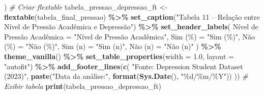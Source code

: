 \documentclass[
]{article}
\newenvironment{Shaded}{\begin{snugshade}}{\end{snugshade}}
\newcommand{\AttributeTok}[1]{\textcolor[rgb]{0.13,0.29,0.53}{#1}}
\newcommand{\CommentTok}[1]{\textcolor[rgb]{0.56,0.35,0.01}{\textit{#1}}}
\newcommand{\FloatTok}[1]{\textcolor[rgb]{0.00,0.00,0.81}{#1}}
\newcommand{\FunctionTok}[1]{\textcolor[rgb]{0.13,0.29,0.53}{\textbf{#1}}}
\newcommand{\NormalTok}[1]{#1}
\newcommand{\OtherTok}[1]{\textcolor[rgb]{0.56,0.35,0.01}{#1}}
\newcommand{\SpecialCharTok}[1]{\textcolor[rgb]{0.81,0.36,0.00}{\textbf{#1}}}
\newcommand{\StringTok}[1]{\textcolor[rgb]{0.31,0.60,0.02}{#1}}
\begin{document}
\begin{Shaded}
\begin{Highlighting}[]
\NormalTok{  )}
\CommentTok{\# Criar flextable}
\NormalTok{tabela\_pressao\_depressao\_ft }\OtherTok{\textless{}{-}} \FunctionTok{flextable}\NormalTok{(tabela\_final\_pressao) }\SpecialCharTok{\%\textgreater{}\%}
  \FunctionTok{set\_caption}\NormalTok{(}\StringTok{"Tabela 11 – Relação entre Nível de Pressão Acadêmica e Depressão"}\NormalTok{) }\SpecialCharTok{\%\textgreater{}\%}
  \FunctionTok{set\_header\_labels}\NormalTok{(}
    \StringTok{\textasciigrave{}}\AttributeTok{Nível de Pressão Acadêmica}\StringTok{\textasciigrave{}} \OtherTok{=} \StringTok{"Nível de Pressão Acadêmica"}\NormalTok{,}
    \StringTok{\textasciigrave{}}\AttributeTok{Sim (\%)}\StringTok{\textasciigrave{}} \OtherTok{=} \StringTok{"Sim (\%)"}\NormalTok{,}
    \StringTok{\textasciigrave{}}\AttributeTok{Não (\%)}\StringTok{\textasciigrave{}} \OtherTok{=} \StringTok{"Não (\%)"}\NormalTok{,}
    \StringTok{\textasciigrave{}}\AttributeTok{Sim (n)}\StringTok{\textasciigrave{}} \OtherTok{=} \StringTok{"Sim (n)"}\NormalTok{,}
    \StringTok{\textasciigrave{}}\AttributeTok{Não (n)}\StringTok{\textasciigrave{}} \OtherTok{=} \StringTok{"Não (n)"}
\NormalTok{  ) }\SpecialCharTok{\%\textgreater{}\%}
  \FunctionTok{theme\_vanilla}\NormalTok{() }\SpecialCharTok{\%\textgreater{}\%}
  \FunctionTok{set\_table\_properties}\NormalTok{(}\AttributeTok{width =} \FloatTok{1.0}\NormalTok{, }\AttributeTok{layout =} \StringTok{"autofit"}\NormalTok{) }\SpecialCharTok{\%\textgreater{}\%}
  \FunctionTok{add\_footer\_lines}\NormalTok{(}\FunctionTok{c}\NormalTok{(}
    \StringTok{"Fonte: Depression Student Dataset (2023)"}\NormalTok{,}
    \FunctionTok{paste}\NormalTok{(}\StringTok{"Data da análise:"}\NormalTok{, }\FunctionTok{format}\NormalTok{(}\FunctionTok{Sys.Date}\NormalTok{(), }\StringTok{"\%d/\%m/\%Y"}\NormalTok{))}
\NormalTok{  ))}
\CommentTok{\# Exibir tabela}
\FunctionTok{print}\NormalTok{(tabela\_pressao\_depressao\_ft)}


\end{Highlighting}
\end{Shaded}
\end{document}

